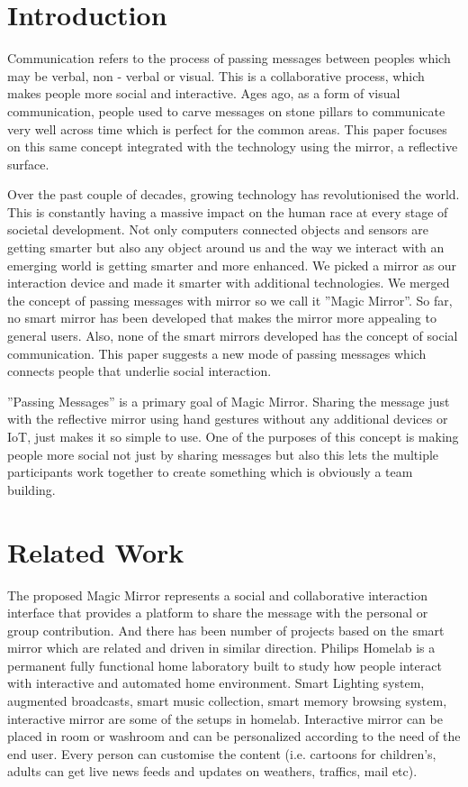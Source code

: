 
\section{Introduction}

Communication refers to the process of passing messages between peoples which may be verbal, non - verbal or visual. This is a collaborative process, which makes people more social and interactive. Ages ago, as a form of visual communication, people used to carve messages on stone pillars to communicate very well across time which is perfect for the common areas. This paper focuses on this same concept integrated with the technology using the mirror, a reflective surface.

Over the past couple of decades, growing technology has revolutionised the world. This is constantly having a massive impact on the human race at every stage of societal development. Not only computers connected objects and sensors are getting smarter but also any object around us and the way we interact with an emerging world is getting smarter and more enhanced. We picked a mirror as our interaction device and made it smarter with additional technologies. We merged the concept of passing messages with mirror so we call it ''Magic Mirror''. So far, no smart mirror has been developed that makes the mirror more appealing to general users. Also, none of the smart mirrors developed has the concept of social communication. This paper suggests a new mode of passing messages which connects people that underlie social interaction.

''Passing Messages'' is a primary goal of Magic Mirror. Sharing the message just with the reflective mirror using hand gestures without any additional devices or IoT, just makes it so simple to use. One of the purposes of this concept is making people more social not just by sharing messages but also this lets the multiple participants work together to create something which is obviously a team building.
\section{Related Work}
The proposed Magic Mirror represents a social and collaborative interaction interface that provides a platform to share the message with the personal or group contribution. And there has been number of projects based on the smart mirror which are related and driven in similar direction. Philips Homelab is a permanent fully functional home laboratory built to study how people interact with interactive and automated home environment. Smart Lighting system, augmented broadcasts, smart music collection, smart memory browsing system, interactive mirror are some of the setups in homelab. Interactive mirror can be placed in room or washroom and can be personalized according to the need of the end user. Every person can customise the content (i.e. cartoons for children's, adults can get live news feeds and updates on weathers, traffics, mail etc).

